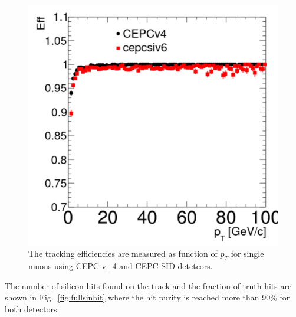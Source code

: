 \begin{figure}[hbtp]
\begin{center}
\includegraphics[width=0.45\textheight,keepaspectratio]{Figures/TrackingSystem/FullSilicon/Plot_muon_Eff_Pt.pdf}
\caption{The tracking efficiencies are measured as function of $p_T$ for single muons using CEPC v\_4 and 
CEPC-SID detetcors. \label{fig:fullsieff}}
\end{center}
\end{figure}

The number of silicon hits found on the track and the fraction of truth hits  are shown in Fig.~\ref{fig:fullsinhit} where the hit 
purity is reached more than 90\% for both detectors. 

